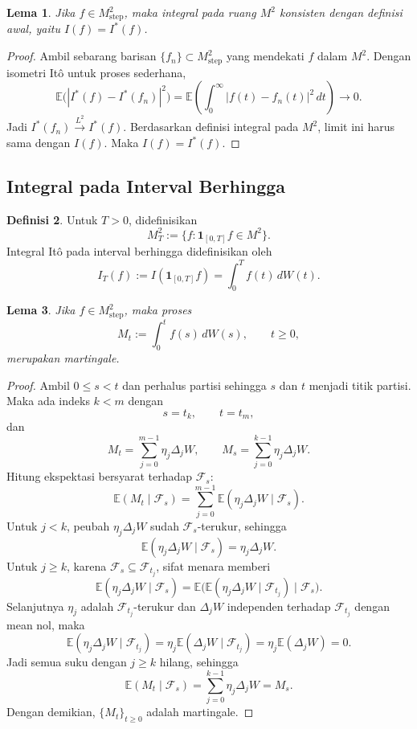 \documentclass[12pt,a4paper]{article}
\theoremstyle{definition}
\newtheorem{definisi}{Definisi}[section]
\theoremstyle{plain}
\newtheorem{lema}[definisi]{Lema}
\newcommand{\E}{\mathbb{E}}
\newcommand{\F}{\mathcal{F}}
\newcommand{\ind}{\mathbf{1}}
\begin{document}
\begin{lema}
  Jika $f\in M_{\mathrm{step}}^2$, maka integral pada ruang $M^2$ konsisten
  dengan definisi awal, yaitu $I(f)=I^\ast(f)$.
\end{lema}

\begin{proof}
  Ambil sebarang barisan $\{f_n\}\subset M_{\mathrm{step}}^2$ yang mendekati $f$
  dalam $M^2$. Dengan isometri It\^o untuk proses sederhana,
  \[
    \E\bigl(|I^\ast(f)-I^\ast(f_n)|^2\bigr)
    =
    \E\left(\int_0^\infty |f(t)-f_n(t)|^2\,dt\right)\to 0.
  \]
  Jadi $I^\ast(f_n)\xrightarrow{L^2}I^\ast(f)$. Berdasarkan definisi integral
  pada $M^2$, limit ini harus sama dengan $I(f)$. Maka $I(f)=I^\ast(f)$.
\end{proof}

\subsection{Integral pada Interval Berhingga}

\begin{definisi}
  Untuk $T>0$, didefinisikan
  \[
    M_T^2:=\{f:\ind_{[0,T]}f\in M^2\}.
  \]
  Integral It\^o pada interval berhingga didefinisikan oleh
  \[
    I_T(f):=I(\ind_{[0,T]}f)=\int_0^T f(t)\,dW(t).
  \]
\end{definisi}

\begin{lema}
  Jika $f\in M_{\mathrm{step}}^2$, maka proses
  \[
    M_t:=\int_0^t f(s)\,dW(s), \qquad t\ge 0,
  \]
  merupakan martingale.
\end{lema}

\begin{proof}
  Ambil $0\le s<t$ dan perhalus partisi sehingga $s$ dan $t$ menjadi titik
  partisi. Maka ada indeks $k<m$ dengan
  \[
    s=t_k,\qquad t=t_m,
  \]
  dan
  \[
    M_t=\sum_{j=0}^{m-1}\eta_j\Delta_jW,
    \qquad
    M_s=\sum_{j=0}^{k-1}\eta_j\Delta_jW.
  \]
  Hitung ekspektasi bersyarat terhadap $\F_s$:
  \[
    \E(M_t\mid\F_s)
    =
    \sum_{j=0}^{m-1}\E(\eta_j\Delta_jW\mid\F_s).
  \]
  Untuk $j<k$, peubah $\eta_j\Delta_jW$ sudah $\F_s$-terukur, sehingga
  \[
    \E(\eta_j\Delta_jW\mid\F_s)=\eta_j\Delta_jW.
  \]
  Untuk $j\ge k$, karena $\F_s\subseteq \F_{t_j}$, sifat menara memberi
  \[
    \E(\eta_j\Delta_jW\mid\F_s)
    =
    \E\bigl(\E(\eta_j\Delta_jW\mid\F_{t_j})\mid\F_s\bigr).
  \]
  Selanjutnya $\eta_j$ adalah $\F_{t_j}$-terukur dan $\Delta_jW$ independen
  terhadap $\F_{t_j}$ dengan mean nol, maka
  \[
    \E(\eta_j\Delta_jW\mid\F_{t_j})
    =
    \eta_j\E(\Delta_jW\mid\F_{t_j})
    =
    \eta_j\E(\Delta_jW)=0.
  \]
  Jadi semua suku dengan $j\ge k$ hilang, sehingga
  \[
    \E(M_t\mid\F_s)=\sum_{j=0}^{k-1}\eta_j\Delta_jW=M_s.
  \]
  Dengan demikian, $\{M_t\}_{t\ge 0}$ adalah martingale.
\end{proof}
\end{document}
